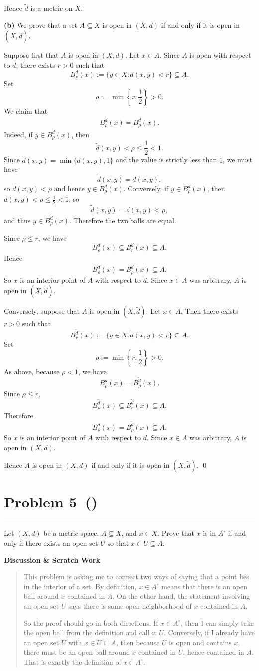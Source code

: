 \documentclass[12pt]{article}
\makeatletter
\newenvironment{scratch}{%
  \par\smallskip
  \noindent\textbf{Discussion \& Scratch Work}\begin{quote}\small
}{%
  \end{quote}\smallskip
}
\newcommand{\problem}[2][]{%
  \def\prob@title{Problem #2\if\relax\detokenize{#1}\relax\else\ (\textit{#1})\fi}%
  \phantomsection%
  \pdfbookmark[1]{\prob@title}{prob#2}%
  \addcontentsline{toc}{section}{\prob@title}%
  \section*{\prob@title}%
  \vspace{-0.25em}\hrule\vspace{0.8em}%
}
\makeatother
\begin{document}
Hence $\tilde d$ is a metric on $X$.

\textbf{(b)} We prove that a set $A\subseteq X$ is open in $(X,d)$ if and only if it is open in $(X,\tilde d)$.

Suppose first that $A$ is open in $(X,d)$. Let $x\in A$. Since $A$ is open with respect to $d$, there exists $r>0$ such that
\[
B_r^d(x):=\{y\in X:d(x,y)<r\}\subseteq A.
\]
Set
\[
\rho:=\min\left\{r,\frac12\right\}>0.
\]
We claim that
\[
B_{\rho}^{\tilde d}(x)=B_{\rho}^{d}(x).
\]
Indeed, if $y\in B_{\rho}^{\tilde d}(x)$, then
\[
\tilde d(x,y)<\rho\le \frac12<1.
\]
Since $\tilde d(x,y)=\min\{d(x,y),1\}$ and the value is strictly less than $1$, we must have
\[
\tilde d(x,y)=d(x,y),
\]
so $d(x,y)<\rho$ and hence $y\in B_{\rho}^{d}(x)$. Conversely, if $y\in B_{\rho}^{d}(x)$, then $d(x,y)<\rho\le \frac12<1$, so
\[
\tilde d(x,y)=d(x,y)<\rho,
\]
and thus $y\in B_{\rho}^{\tilde d}(x)$. Therefore the two balls are equal.

Since $\rho\le r$, we have
\[
B_{\rho}^{d}(x)\subseteq B_r^{d}(x)\subseteq A.
\]
Hence
\[
B_{\rho}^{\tilde d}(x)=B_{\rho}^{d}(x)\subseteq A.
\]
So $x$ is an interior point of $A$ with respect to $\tilde d$. Since $x\in A$ was arbitrary, $A$ is open in $(X,\tilde d)$.

Conversely, suppose that $A$ is open in $(X,\tilde d)$. Let $x\in A$. Then there exists $r>0$ such that
\[
B_r^{\tilde d}(x):=\{y\in X:\tilde d(x,y)<r\}\subseteq A.
\]
Set
\[
\rho:=\min\left\{r,\frac12\right\}>0.
\]
As above, because $\rho<1$, we have
\[
B_{\rho}^{d}(x)=B_{\rho}^{\tilde d}(x).
\]
Since $\rho\le r$,
\[
B_{\rho}^{\tilde d}(x)\subseteq B_r^{\tilde d}(x)\subseteq A.
\]
Therefore
\[
B_{\rho}^{d}(x)=B_{\rho}^{\tilde d}(x)\subseteq A.
\]
So $x$ is an interior point of $A$ with respect to $d$. Since $x\in A$ was arbitrary, $A$ is open in $(X,d)$.

Hence $A$ is open in $(X,d)$ if and only if it is open in $(X,\tilde d)$.
\qed

\newpage

\problem[]{5}
Let $(X,d)$ be a metric space, $A\subseteq X$, and $x\in X$. Prove that $x$ is
in $A^\circ$ if and only if there exists an open set $U$ so that
$x\in U\subseteq A$.

\begin{scratch}
This problem is asking me to connect two ways of saying that a point lies in the interior of a set. By definition, $x\in A^\circ$ means that there is an open ball around $x$ contained in $A$. On the other hand, the statement involving an open set $U$ says there is some open neighborhood of $x$ contained in $A$.

So the proof should go in both directions. If $x\in A^\circ$, then I can simply take the open ball from the definition and call it $U$. Conversely, if I already have an open set $U$ with $x\in U\subseteq A$, then because $U$ is open and contains $x$, there must be an open ball around $x$ contained in $U$, hence contained in $A$. That is exactly the definition of $x\in A^\circ$.
\end{scratch}
\end{document}
